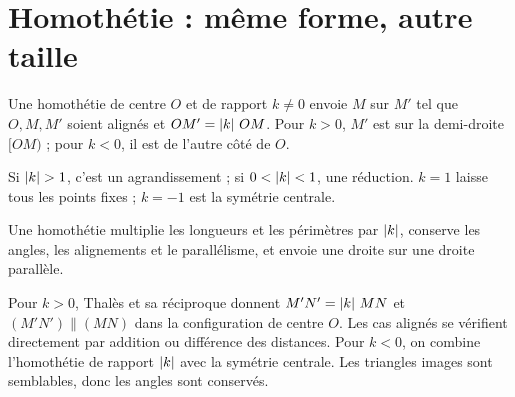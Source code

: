 \documentclass[../cours_3e.tex]{subfiles}
\begin{document}
\section{Homothétie : même forme, autre taille}
\begin{definition}
Une homothétie de centre $O$ et de rapport $k\ne0$ envoie $M$ sur $M'$ tel que $O,M,M'$ soient alignés et $OM'=\left|k\right|\,OM$. Pour $k>0$, $M'$ est sur la demi-droite $[OM)$ ; pour $k<0$, il est de l'autre côté de $O$.
\end{definition}
Si $\abs k>1$, c'est un agrandissement ; si $0<\left|k\right|<1$, une réduction. $k=1$ laisse tous les points fixes ; $k=-1$ est la symétrie centrale.
\begin{center}
\end{center}
\begin{propriete}
Une homothétie multiplie les longueurs et les périmètres par $\left|k\right|$, conserve les angles, les alignements et le parallélisme, et envoie une droite sur une droite parallèle.
\end{propriete}
\begin{demonstration}
Pour $k>0$, Thalès et sa réciproque donnent $M'N'=\left|k\right|\,MN$ et $(M'N')\parallel(MN)$ dans la configuration de centre $O$. Les cas alignés se vérifient directement par addition ou différence des distances. Pour $k<0$, on combine l'homothétie de rapport $\left|k\right|$ avec la symétrie centrale. Les triangles images sont semblables, donc les angles sont conservés.
\end{demonstration}
\end{document}

